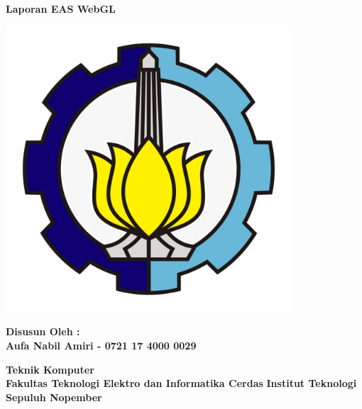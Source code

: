 
\begin{titlepage}
    \begin{center}

        \huge
        \textbf{Laporan EAS WebGL}

        \vfill

        \includegraphics[width=0.8\textwidth]{logo.png}

        \vfill

        \large
        \textbf{Disusun Oleh :}\\
        \textbf{Aufa Nabil Amiri - 0721 17 4000 0029}

        \vspace*{2cm}

        \normalsize
        \textbf{Teknik Komputer}\\
        \textbf{Fakultas Teknologi Elektro dan Informatika Cerdas}
        \textbf{Institut Teknologi Sepuluh Nopember}

    \end{center}
\end{titlepage}